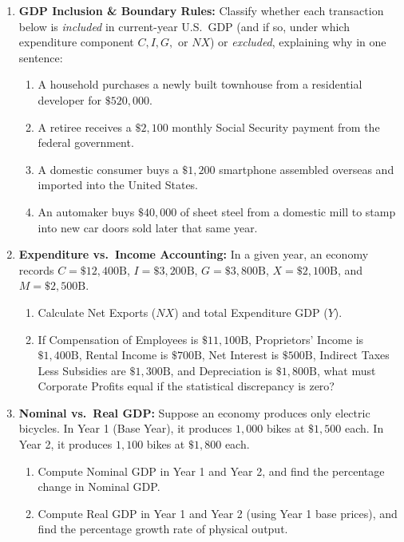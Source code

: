 \documentclass[11pt,letterpaper]{article}
\begin{document}
\begin{enumerate}
    \item \textbf{GDP Inclusion \& Boundary Rules:} Classify whether each transaction below is \emph{included} in current-year U.S.\ GDP (and if so, under which expenditure component $C, I, G,$ or $NX$) or \emph{excluded}, explaining why in one sentence:
    \begin{enumerate}
        \item A household purchases a newly built townhouse from a residential developer for $\$520{,}000$.
        \item A retiree receives a $\$2{,}100$ monthly Social Security payment from the federal government.
        \item A domestic consumer buys a $\$1{,}200$ smartphone assembled overseas and imported into the United States.
        \item An automaker buys $\$40{,}000$ of sheet steel from a domestic mill to stamp into new car doors sold later that same year.
    \end{enumerate}
    \item \textbf{Expenditure vs.\ Income Accounting:} In a given year, an economy records $C = \$12{,}400\text{B}$, $I = \$3{,}200\text{B}$, $G = \$3{,}800\text{B}$, $X = \$2{,}100\text{B}$, and $M = \$2{,}500\text{B}$.
    \begin{enumerate}
        \item Calculate Net Exports ($NX$) and total Expenditure GDP ($Y$).
        \item If Compensation of Employees is $\$11{,}100\text{B}$, Proprietors' Income is $\$1{,}400\text{B}$, Rental Income is $\$700\text{B}$, Net Interest is $\$500\text{B}$, Indirect Taxes Less Subsidies are $\$1{,}300\text{B}$, and Depreciation is $\$1{,}800\text{B}$, what must Corporate Profits equal if the statistical discrepancy is zero?
    \end{enumerate}
    \item \textbf{Nominal vs.\ Real GDP:} Suppose an economy produces only electric bicycles. In Year 1 (Base Year), it produces $1{,}000$ bikes at $\$1{,}500$ each. In Year 2, it produces $1{,}100$ bikes at $\$1{,}800$ each.
    \begin{enumerate}
        \item Compute Nominal GDP in Year 1 and Year 2, and find the percentage change in Nominal GDP.
        \item Compute Real GDP in Year 1 and Year 2 (using Year 1 base prices), and find the percentage growth rate of physical output.
    \end{enumerate}
\end{enumerate}
\end{document}
